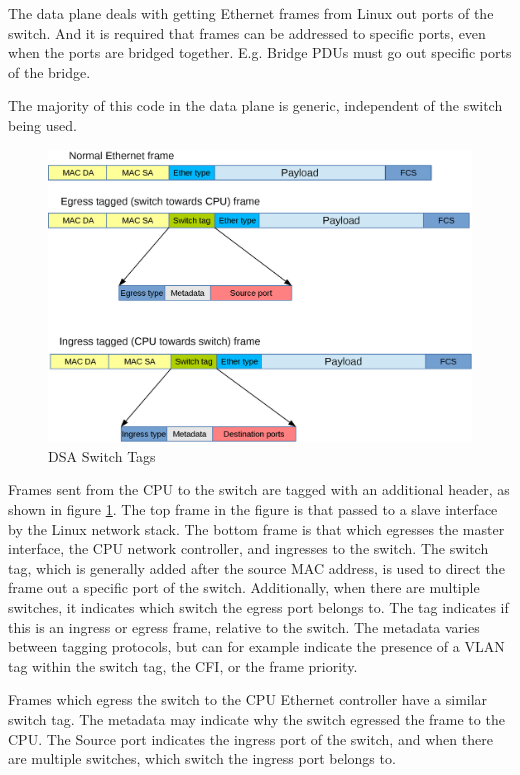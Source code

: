 \documentclass[letterpaper]{article}
\begin{document}
The data plane deals with getting Ethernet frames from Linux out ports
of the switch. And it is required that frames can be addressed to
specific ports, even when the ports are bridged together. E.g. Bridge
PDUs must go out specific ports of the bridge.

The majority of this code in the data plane is generic, independent of
the switch being used.

\begin{figure}[ht]
  \centering
  \includegraphics[width=\columnwidth]{DSA-frame-processing.eps}
  \caption{DSA Switch Tags}
  \label{DSA-frame-processing}
\end{figure}

Frames sent from the CPU to the switch are tagged with an additional
header, as shown in figure \ref{DSA-frame-processing}. The top frame
in the figure is that passed to a slave interface by the Linux network
stack. The bottom frame is that which egresses the master interface,
the CPU network controller, and ingresses to the switch. The switch
tag, which is generally added after the source MAC address, is used to
direct the frame out a specific port of the switch. Additionally, when
there are multiple switches, it indicates which switch the egress port
belongs to. The tag indicates if this is an ingress or egress frame,
relative to the switch. The metadata varies between tagging protocols,
but can for example indicate the presence of a VLAN tag within the
switch tag, the CFI, or the frame priority.

Frames which egress the switch to the CPU Ethernet controller have a
similar switch tag. The metadata may indicate why the switch egressed
the frame to the CPU. The Source port indicates the ingress port of
the switch, and when there are multiple switches, which switch the
ingress port belongs to.
\end{document}
